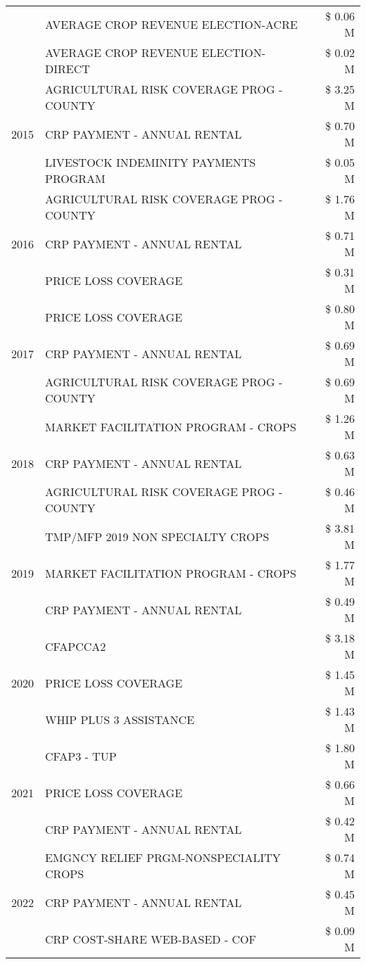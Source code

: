 \begin{tabular}{llr}
 & AVERAGE CROP REVENUE ELECTION-ACRE & \$ 0.06 M \\
 & AVERAGE CROP REVENUE ELECTION-DIRECT & \$ 0.02 M \\
\cline{1-3}
\multirow[t]{3}{*}{2015} & AGRICULTURAL RISK COVERAGE PROG - COUNTY & \$ 3.25 M \\
 & CRP PAYMENT - ANNUAL RENTAL & \$ 0.70 M \\
 & LIVESTOCK INDEMINITY PAYMENTS PROGRAM & \$ 0.05 M \\
\cline{1-3}
\multirow[t]{3}{*}{2016} & AGRICULTURAL RISK COVERAGE PROG - COUNTY & \$ 1.76 M \\
 & CRP PAYMENT - ANNUAL RENTAL & \$ 0.71 M \\
 & PRICE LOSS COVERAGE & \$ 0.31 M \\
\cline{1-3}
\multirow[t]{3}{*}{2017} & PRICE LOSS COVERAGE & \$ 0.80 M \\
 & CRP PAYMENT - ANNUAL RENTAL & \$ 0.69 M \\
 & AGRICULTURAL RISK COVERAGE PROG - COUNTY & \$ 0.69 M \\
\cline{1-3}
\multirow[t]{3}{*}{2018} & MARKET FACILITATION PROGRAM - CROPS & \$ 1.26 M \\
 & CRP PAYMENT - ANNUAL RENTAL & \$ 0.63 M \\
 & AGRICULTURAL RISK COVERAGE PROG - COUNTY & \$ 0.46 M \\
\cline{1-3}
\multirow[t]{3}{*}{2019} & TMP/MFP 2019 NON SPECIALTY CROPS & \$ 3.81 M \\
 & MARKET FACILITATION PROGRAM - CROPS & \$ 1.77 M \\
 & CRP PAYMENT - ANNUAL RENTAL & \$ 0.49 M \\
\cline{1-3}
\multirow[t]{3}{*}{2020} & CFAPCCA2 & \$ 3.18 M \\
 & PRICE LOSS COVERAGE & \$ 1.45 M \\
 & WHIP PLUS 3 ASSISTANCE & \$ 1.43 M \\
\cline{1-3}
\multirow[t]{3}{*}{2021} & CFAP3 - TUP & \$ 1.80 M \\
 & PRICE LOSS COVERAGE & \$ 0.66 M \\
 & CRP PAYMENT - ANNUAL RENTAL & \$ 0.42 M \\
\cline{1-3}
\multirow[t]{3}{*}{2022} & EMGNCY RELIEF PRGM-NONSPECIALITY CROPS & \$ 0.74 M \\
 & CRP PAYMENT - ANNUAL RENTAL & \$ 0.45 M \\
 & CRP COST-SHARE WEB-BASED - COF & \$ 0.09 M \\
\cline{1-3}
\bottomrule
\end{tabular}
